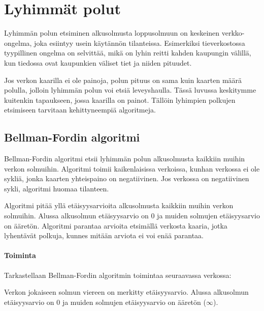 \chapter{Lyhimmät polut}

Lyhimmän polun etsiminen alkusolmusta loppusolmuun
on keskeinen verkko-ongelma, joka esiintyy usein
käytännön tilanteissa.
Esimerkiksi tieverkostossa
tyypillinen ongelma on selvittää,
mikä on lyhin reitti kahden kaupungin välillä,
kun tiedossa ovat kaupunkien väliset tiet ja niiden pituudet.

Jos verkon kaarilla ei ole painoja,
polun pituus on sama kuin kaarten
määrä polulla, jolloin lyhimmän polun
voi etsiä leveyshaulla.
Tässä luvussa keskitymme kuitenkin
tapaukseen, jossa kaarilla on painot.
Tällöin lyhimpien polkujen etsimiseen
tarvitaan kehittyneempiä algoritmeja.

\section{Bellman-Fordin algoritmi}

Bellman-Fordin algoritmi etsii
lyhimmän polun alkusolmusta
kaikkiin muihin verkon solmuihin.
Algoritmi toimii kaikenlaisissa verkoissa,
kunhan verkossa ei ole sykliä,
jonka kaarten yhteispaino on negatiivinen.
Jos verkossa on negatiivinen sykli,
algoritmi huomaa tilanteen.

Algoritmi pitää yllä etäisyysarvioita
alkusolmusta kaikkiin muihin verkon solmuihin.
Alussa alkusolmun etäisyysarvio on 0
ja muiden solmujen etäisyys\-arvio on ääretön.
Algoritmi parantaa arvioita
etsimällä verkosta kaaria,
jotka lyhentävät polkuja,
kunnes mitään arviota ei voi enää parantaa.

\subsubsection{Toiminta}

Tarkastellaan Bellman-Fordin
algoritmin toimintaa seuraavassa verkossa:
\begin{center}
\end{center}
Verkon jokaiseen solmun viereen on merkitty etäisyysarvio.
Alussa alkusolmun etäisyysarvio on 0
ja muiden solmujen etäisyysarvio on
ääretön ($\infty$).

